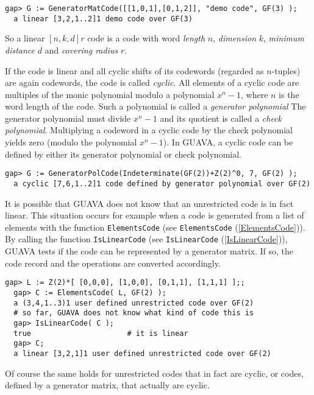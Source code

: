 \documentclass[a4paper,11pt]{report}
\begin{document}
{\begin{Verbatim}[fontsize=\small,frame=single,label=Example]
  gap> G := GeneratorMatCode([[1,0,1],[0,1,2]], "demo code", GF(3) );
  a linear [3,2,1..2]1 demo code over GF(3) 
\end{Verbatim}
 So a linear $[n, k, d]r$ code  is a code with word \emph{length} $n$, \emph{dimension} $k$, \emph{minimum distance} $d$ and \emph{covering radius} $r$. 

 If the code is linear and all cyclic shifts of its codewords (regarded as $n$-tuples) are again codewords, the code is called \emph{cyclic}.  All elements of a cyclic code are multiples of the monic polynomial modulo a
polynomial $x^n -1$, where $n$ is the word length of the code. Such a polynomial is called a \emph{generator polynomial}  The generator polynomial must divide $x^n-1$ and its quotient is called a \emph{check polynomial}.  Multiplying a codeword in a cyclic code by the check polynomial yields zero
(modulo the polynomial $x^n -1$). In \textsf{GUAVA}, a cyclic code can be defined by either its generator polynomial or check
polynomial. 
\begin{Verbatim}[fontsize=\small,frame=single,label=Example]
  gap> G := GeneratorPolCode(Indeterminate(GF(2))+Z(2)^0, 7, GF(2) );
  a cyclic [7,6,1..2]1 code defined by generator polynomial over GF(2)
\end{Verbatim}
 It is possible that \textsf{GUAVA} does not know that an unrestricted code is in fact linear. This situation
occurs for example when a code is generated from a list of elements with the
function \texttt{ElementsCode} (see \texttt{ElementsCode} (\ref{ElementsCode})). By calling the function \texttt{IsLinearCode} (see \texttt{IsLinearCode} (\ref{IsLinearCode})), \textsf{GUAVA} tests if the code can be represented by a generator matrix. If so, the code
record and the operations are converted accordingly. 
\begin{Verbatim}[fontsize=\small,frame=single,label=Example]
  gap> L := Z(2)*[ [0,0,0], [1,0,0], [0,1,1], [1,1,1] ];;
  gap> C := ElementsCode( L, GF(2) );
  a (3,4,1..3)1 user defined unrestricted code over GF(2)
  # so far, GUAVA does not know what kind of code this is
  gap> IsLinearCode( C );
  true                      # it is linear
  gap> C;
  a linear [3,2,1]1 user defined unrestricted code over GF(2) 
\end{Verbatim}
  Of course the same holds for unrestricted codes that in fact are cyclic, or
codes, defined by a generator matrix, that actually are cyclic. 

}
\end{document}
